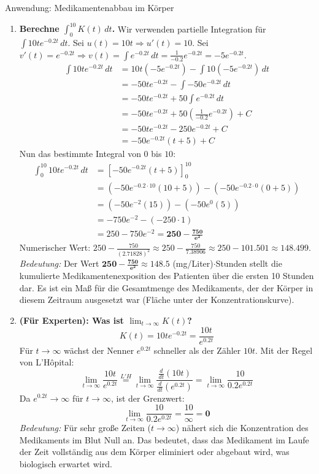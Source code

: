 \begin{loesungsumgebung}{Anwendung: Medikamentenabbau im Körper}
\begin{enumerate}[label=(\alph*)]
    \item \textbf{Berechne $\int_0^{10} K(t) \,dt$.}
    Wir verwenden partielle Integration für $\int 10t e^{-0.2t} \,dt$.
    Sei $u(t) = 10t \Rightarrow u'(t) = 10$.
    Sei $v'(t) = e^{-0.2t} \Rightarrow v(t) = \int e^{-0.2t} \,dt = \frac{1}{-0.2}e^{-0.2t} = -5e^{-0.2t}$.
    \begin{align*} \int 10t e^{-0.2t} \,dt &= 10t(-5e^{-0.2t}) - \int 10(-5e^{-0.2t}) \,dt \\ &= -50te^{-0.2t} - \int -50e^{-0.2t} \,dt \\ &= -50te^{-0.2t} + 50 \int e^{-0.2t} \,dt \\ &= -50te^{-0.2t} + 50 \left(\frac{1}{-0.2}e^{-0.2t}\right) + C \\ &= -50te^{-0.2t} - 250e^{-0.2t} + C \\ &= -50e^{-0.2t}(t+5) + C \end{align*}
    Nun das bestimmte Integral von $0$ bis $10$:
    \begin{align*} \int_0^{10} 10t e^{-0.2t} \,dt &= [-50e^{-0.2t}(t+5)]_0^{10} \\ &= \left(-50e^{-0.2 \cdot 10}(10+5)\right) - \left(-50e^{-0.2 \cdot 0}(0+5)\right) \\ &= \left(-50e^{-2}(15)\right) - \left(-50e^0(5)\right) \\ &= -750e^{-2} - (-250 \cdot 1) \\ &= 250 - 750e^{-2} = \mathbf{250 - \frac{750}{e^2}} \end{align*}
    Numerischer Wert: $250 - \frac{750}{(2.71828)^2} \approx 250 - \frac{750}{7.38906} \approx 250 - 101.501 \approx 148.499$.
    \textit{Bedeutung:} Der Wert $\mathbf{250 - \frac{750}{e^2} \approx 148.5}$ (mg/Liter)$\cdot$Stunden stellt die kumulierte Medikamentenexposition des Patienten über die ersten 10 Stunden dar. Es ist ein Maß für die Gesamtmenge des Medikaments, der der Körper in diesem Zeitraum ausgesetzt war (Fläche unter der Konzentrationskurve).

    \item \textbf{(Für Experten): Was ist $\lim_{t \to \infty} K(t)$?}
    $$ K(t) = 10t e^{-0.2t} = \frac{10t}{e^{0.2t}} $$
    Für $t \to \infty$ wächst der Nenner $e^{0.2t}$ schneller als der Zähler $10t$. Mit der Regel von L'Hôpital:
    $$ \lim_{t \to \infty} \frac{10t}{e^{0.2t}} \stackrel{L'H}{=} \lim_{t \to \infty} \frac{\frac{d}{dt}(10t)}{\frac{d}{dt}(e^{0.2t})} = \lim_{t \to \infty} \frac{10}{0.2e^{0.2t}} $$
    Da $e^{0.2t} \to \infty$ für $t \to \infty$, ist der Grenzwert:
    $$ \lim_{t \to \infty} \frac{10}{0.2e^{0.2t}} = \frac{10}{\infty} = \mathbf{0} $$
    \textit{Bedeutung:} Für sehr große Zeiten ($t \to \infty$) nähert sich die Konzentration des Medikaments im Blut Null an. Das bedeutet, dass das Medikament im Laufe der Zeit vollständig aus dem Körper eliminiert oder abgebaut wird, was biologisch erwartet wird.
\end{enumerate}

\end{loesungsumgebung}



